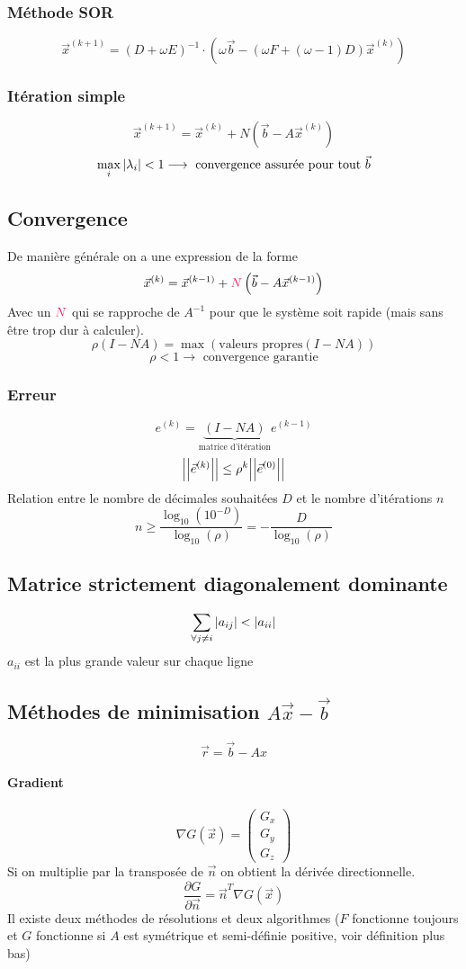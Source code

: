 \documentclass[resume]{subfiles}
\begin{document}
\subsubsection{Méthode SOR}
$$\vec{x}^{(k+1)}=(D+\omega E)^{-1}\cdot \left(\omega \vec{b}-(\omega F+(\omega-1)D)\vec{x}^{(k)}\right)$$
\subsubsection{Itération simple}
$$\vec{x}^{(k+1)}=\vec{x}^{(k)}+N\left(\vec{b}-A\vec{x}^{(k)}\right)$$
$$\max_i\abs{\lambda_i}<1\longrightarrow\text{ convergence assurée pour tout }\vec{b}$$
\subsection{Convergence}
De manière générale on a une expression de la forme
$$\vec{x}^{(k)}=\vec{x}^{(k-1)}+\textcolor{OrangeRed}{N}\left(\vec{b}-A\vec{x}^{(k-1)}\right)$$
Avec un $\textcolor{OrangeRed}{N}$ qui se rapproche de $A^{-1}$ pour que le système soit rapide (mais sans être trop dur à calculer).\\
$$\boxed{\rho(I-NA)=\max\left(\text{valeurs propres}(I-NA)\right)}$$
$$\rho < 1\longrightarrow\text{ convergence garantie}$$
\subsubsection{Erreur}
$$e^{(k)}=\underbrace{(I-NA)}_\text{matrice d'itération}e^{(k-1)}$$
$$\abs{\abs{\vec{e}^{(k)}}}\leq \rho^{k}\abs{\abs{\vec{e}^{(0)}}}$$
Relation entre le nombre de décimales souhaitées $D$ et le nombre d'itérations $n$
$$n\geq \frac{\log_{10}(10^{-D})}{\log_{10}(\rho)}=-\frac{D}{\log_{10}(\rho)}$$
\subsection{Matrice strictement diagonalement dominante}
\label{strict_diag_dom}
$$\sum_{\forall j\neq i}\abs{a_{ij}}<\abs{a_{ii}}$$
$a_{ii}$ est la plus grande valeur sur chaque ligne
\subsection{Méthodes de minimisation $A\vec{x}-\vec{b}$}
$$\boxed{\vec{r}=\vec{b}-Ax}$$
\paragraph{Gradient}
$$\nabla G(\vec{x})=\begin{pmatrix}G_x\\G_y\\G_z\end{pmatrix}$$
Si on multiplie par la transposée de $\vec{n}$ on obtient la dérivée directionnelle.
$$\frac{\partial G}{\partial \vec{n}}=\vec{n}^{T}\nabla G(\vec{x})$$
Il existe deux méthodes de résolutions et deux algorithmes ($F$ fonctionne toujours et $G$ fonctionne si $A$ est symétrique et semi-définie positive, voir définition plus bas) 
\end{document}
